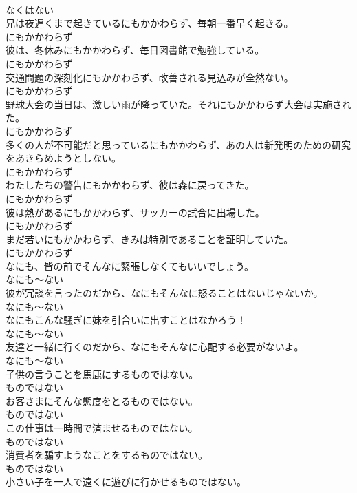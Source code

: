 \documentclass[8pt]{extreport}
\begin{document}
\begin{CJK}{UTF8}{min}
\\	なくはない
\\	兄は夜遅くまで起きているにもかかわらず、毎朝一番早く起きる。	
\\	にもかかわらず
\\	彼は、冬休みにもかかわらず、毎日図書館で勉強している。	
\\	にもかかわらず
\\	交通問題の深刻化にもかかわらず、改善される見込みが全然ない。	
\\	にもかかわらず
\\	野球大会の当日は、激しい雨が降っていた。それにもかかわらず大会は実施された。	
\\	にもかかわらず
\\	多くの人が不可能だと思っているにもかかわらず、あの人は新発明のための研究をあきらめようとしない。	
\\	にもかかわらず
\\	わたしたちの警告にもかかわらず、彼は森に戻ってきた。	
\\	にもかかわらず
\\	彼は熱があるにもかかわらず、サッカーの試合に出場した。	
\\	にもかかわらず
\\	まだ若いにもかかわらず、きみは特別であることを証明していた。	
\\	にもかかわらず
\\	なにも、皆の前でそんなに緊張しなくてもいいでしょう。	
\\	なにも～ない
\\	彼が冗談を言ったのだから、なにもそんなに怒ることはないじゃないか。	
\\	なにも～ない
\\	なにもこんな騒ぎに妹を引合いに出すことはなかろう！	
\\	なにも～ない
\\	友達と一緒に行くのだから、なにもそんなに心配する必要がないよ。	
\\	なにも～ない
\\	子供の言うことを馬鹿にするものではない。	
\\	ものではない
\\	お客さまにそんな態度をとるものではない。	
\\	ものではない
\\	この仕事は一時間で済ませるものではない。	
\\	ものではない
\\	消費者を騙すようなことをするものではない。	
\\	ものではない
\\	小さい子を一人で遠くに遊びに行かせるものではない。	

\end{CJK}
\end{document}
